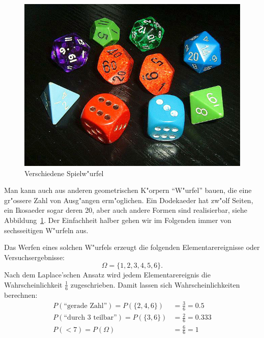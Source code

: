 \begin{figure}
\begin{center}
\includegraphics[width=0.8\hsize]{graphics/Wuerfel5}
\end{center}
\caption{Verschiedene Spielw"urfel\label{bild-spielwuerfel}}
\end{figure}
Man kann auch aus anderen geometrischen K"orpern ``W"urfel'' bauen, die
eine gr"ossere Zahl von Ausg"angen erm"oglichen. Ein Dodekaeder hat
zw"olf Seiten, ein Ikosaeder sogar deren 20, aber auch andere Formen
sind realisierbar, siehe Abbildung~\ref{bild-spielwuerfel}. Der Einfachheit
halber gehen wir im Folgenden immer von sechsseitigen W"urfeln aus.

Das Werfen eines solchen W"urfels erzeugt die folgenden Elementarereignisse
oder Versuchsergebnisse:
\[
\Omega=\{1,2,3,4,5,6\}.
\]
Nach dem Laplace'schen Ansatz wird jedem Elementarereignis die
Wahrscheinlichkeit $\frac16$ zugeschrieben. Damit lassen sich
Wahrscheinlichkeiten berechnen:
\begin{align*}
P(\text{``gerade Zahl''})=P(\{2,4,6\})&=\frac36=0.5\\
P(\text{``durch 3 teilbar''})=P(\{3,6\})&=\frac26=0.333\\
P(< 7)=P(\Omega)&=\frac66=1
\end{align*}

